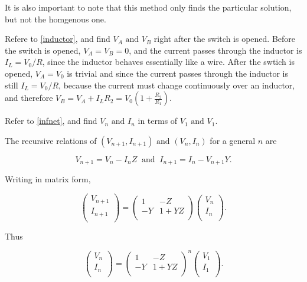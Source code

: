 \documentclass[english,a4paper,12pt]{report}
\begin{document}
It is also important to note that this method only finds the particular solution, but not the homgenous one.

{Refere to \cref{inductor}, and find \(V_{A} \text { and } V_{B}  \) right after the switch is opened.}
{Before the switch is opened, \(V_{A} = V_{B} = 0\), and the current passes through the inductor is \(I_{L} = V_0 /R  \), since the inductor behaves essentially like a wire. After the swtich is opened, \(V_{A} = V_{0}  \) is trivial and since the current passes through the inductor is still \(I_{L} = V_0 /R  \), because the current must change continuously over an inductor, and therefore \(V_{B} = V_{A} + I_{L}R_2 = V_{0} \left( 1+ \frac{R_2 }{R_1 }  \right)   \).   } 


{Refer to \cref{infnet}, and find \(V_{n} \text { and } I_{n}  \) in terms of \(V_1 \text { and } V_1 \).}
{The recursive relations of \((V_{n+1}, I_{n+1}) \text { and } (V_{n}, I_{n})\) for a general \(n\) are

\begin{equation}
    V_{n+1} = V_{n} - I_{n}Z ~\text { and }~ I_{n+1} = I_{n} - V_{n+1}Y.      
\end{equation}

Writing in matrix form,

\begin{equation}
    \begin{pmatrix}
         V_{n+1}  \\
         I_{n+1}  \\
    \end{pmatrix} = \begin{pmatrix}
        1 & -Z   \\
        -Y & 1+YZ  \\
    \end{pmatrix} \begin{pmatrix}
         V_{n}  \\
         I_{n}  \\
    \end{pmatrix}.
\end{equation}

Thus 

\begin{equation}
    \begin{pmatrix}
         V_{n}  \\
         I_{n}  \\
    \end{pmatrix} = \begin{pmatrix}
        1 & -Z  \\
        -Y & 1+YZ  \\
    \end{pmatrix}^{n} \begin{pmatrix}
        V_{1}  \\
        I_{1}  \\
   \end{pmatrix}.
\end{equation}



} 
\end{document}
